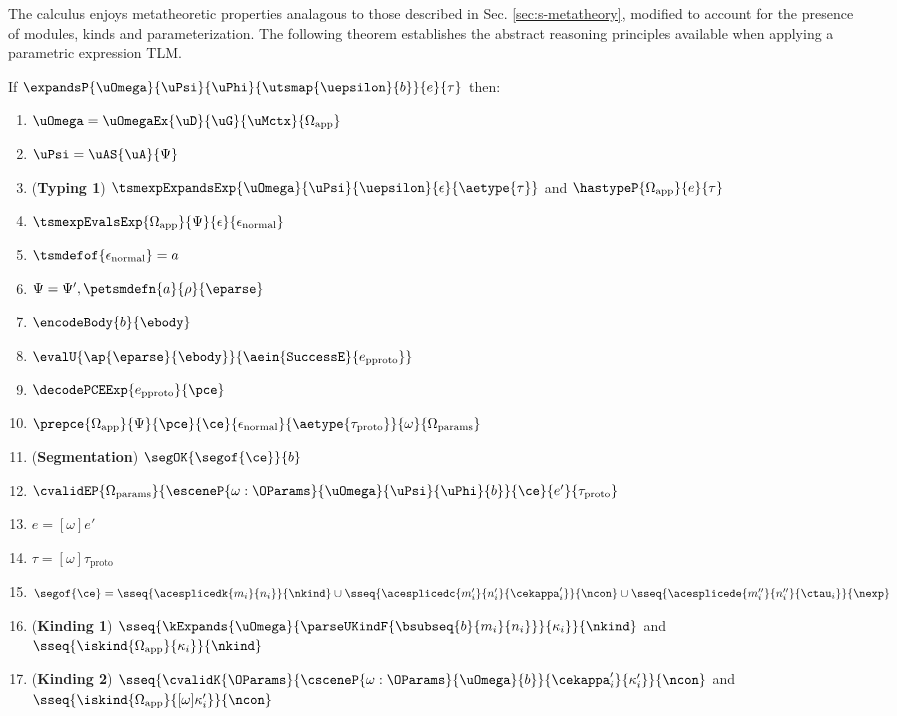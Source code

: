 \documentclass[acmsmall,10pt,review,anonymous]{acmart}\settopmatter{printfolios=true}
\begin{document}
The calculus enjoys metatheoretic properties analagous to those described in Sec. \ref{sec:s-metatheory}, modified to account for the presence of modules, kinds and parameterization. The following theorem establishes the abstract reasoning principles available when applying a parametric expression TLM.
\vspace{-3px}
\begin{theorem}
If $\expandsP{\uOmega}{\uPsi}{\uPhi}{\utsmap{\uepsilon}{b}}{e}{\tau}$ then:
\begin{enumerate}[nolistsep]
  \item $\uOmega=\uOmegaEx{\uD}{\uG}{\uMctx}{\Omega_\text{app}}$
  \item $\uPsi=\uAS{\uA}{\Psi}$
  \item (\textbf{Typing 1}) $\tsmexpExpandsExp{\uOmega}{\uPsi}{\uepsilon}{\epsilon}{\aetype{\tau}}$ and $\hastypeP{\Omega_\text{app}}{e}{\tau}$
  \item $\tsmexpEvalsExp{\Omega_\text{app}}{\Psi}{\epsilon}{\epsilon_\text{normal}}$
  \item $\tsmdefof{\epsilon_\text{normal}}=a$
  \item $\Psi = \Psi', \petsmdefn{a}{\rho}{\eparse}$
  \item $\encodeBody{b}{\ebody}$
    \item $\evalU{\ap{\eparse}{\ebody}}{\aein{\mathtt{SuccessE}}{e_\text{pproto}}}$
  \item $\decodePCEExp{e_\text{pproto}}{\pce}$
  \item $\prepce{\Omega_\text{app}}{\Psi}{\pce}{\ce}{\epsilon_\text{normal}}{\aetype{\tau_\text{proto}}}{\omega}{\Omega_\text{params}}$
  \item (\textbf{Segmentation}) $\segOK{\segof{\ce}}{b}$
  \item $\cvalidEP{\Omega_\text{params}}{\esceneP{\omega : \OParams}{\uOmega}{\uPsi}{\uPhi}{b}}{\ce}{e'}{\tau_\text{proto}}$
  \item $e = [\omega]e'$
  \item $\tau = [\omega]\tau_\text{proto}$
  \item $
    \segof{\ce} = \sseq{\acesplicedk{m_i}{n_i}}{\nkind} \cup \sseq{\acesplicedc{m'_i}{n'_i}{\cekappa'_i}}{\ncon} \cup 
               \sseq{\acesplicede{m''_i}{n''_i}{\ctau_i}}{\nexp}
    $
  \item (\textbf{Kinding 1}) $\sseq{\kExpands{\uOmega}{\parseUKindF{\bsubseq{b}{m_i}{n_i}}}{\kappa_i}}{\nkind}$ and $\sseq{\iskind{\Omega_\text{app}}{\kappa_i}}{\nkind}$
  \item (\textbf{Kinding 2}) $\sseq{\cvalidK{\OParams}{\csceneP{\omega : \OParams}{\uOmega}{b}}{\cekappa'_i}{\kappa'_i}}{\ncon}$ and $\sseq{\iskind{\Omega_\text{app}}{[\omega]\kappa'_i}}{\ncon}$

\end{enumerate}
\end{theorem}
\end{document}
